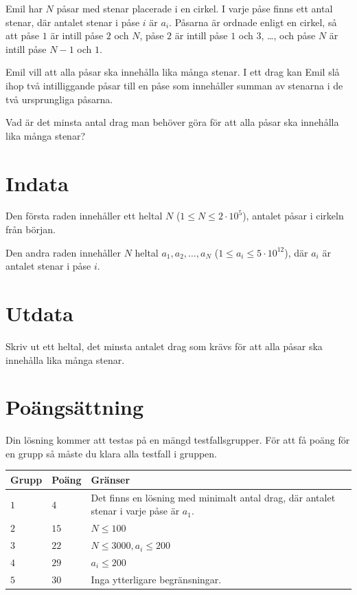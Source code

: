 \noindent

Emil har $N$ påsar med stenar placerade i en cirkel. 
I varje påse finns ett antal stenar, där antalet stenar i påse $i$ är $a_i$. 
Påsarna är ordnade enligt en cirkel, så att påse $1$ är intill påse $2$ och $N$, påse $2$ är intill påse $1$ och $3$, \dots, och påse $N$ är intill påse $N-1$ och $1$.

Emil vill att alla påsar ska innehålla lika många stenar. 
I ett drag kan Emil slå ihop två intilliggande påsar till en påse som innehåller summan av stenarna i de två ursprungliga påsarna.

Vad är det minsta antal drag man behöver göra för att alla påsar ska innehålla lika många stenar?

\section*{Indata}
Den första raden innehåller ett heltal $N$ ($1 \le N \le 2\cdot10^5$), antalet påsar i cirkeln från början.

Den andra raden innehåller $N$ heltal $a_1, a_2, \ldots, a_N$ ($1 \le a_i \le 5 \cdot 10^{12}$), där $a_i$ är antalet stenar i påse $i$.


\section*{Utdata}
Skriv ut ett heltal, det minsta antalet drag som krävs för att alla påsar ska innehålla lika många stenar.

\section*{Poängsättning}
Din lösning kommer att testas på en mängd testfallsgrupper.
För att få poäng för en grupp så måste du klara alla testfall i gruppen.

\noindent
\begin{tabular}{| l | l | p{12cm} |}
  \hline
  \textbf{Grupp} & \textbf{Poäng} & \textbf{Gränser} \\ \hline
  $1$    & $4$        & Det finns en lösning med minimalt antal drag, där antalet stenar i varje påse är $a_1$. \\ \hline
  $2$    & $15$       & $N \le 100$ \\ \hline 
  $3$    & $22$       & $N \le 3000, a_i \le 200$ \\ \hline
  $4$    & $29$       & $a_i \le 200$ \\ \hline
  $5$    & $30$       & Inga ytterligare begränsningar. \\ \hline 
\end{tabular}


